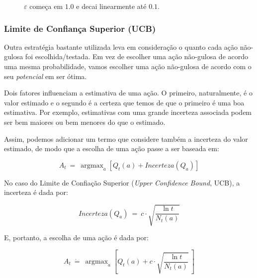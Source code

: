 \documentclass{article}
\DeclareMathOperator*{\argmax}{argmax}
\begin{document}
\begin{itemize}
\begin{figure}[ht]
                        \caption{$\varepsilon$ começa em $1.0$ e decai linearmente até $0.1$.}
                        \label{diag:epsilon-decay}
                    \end{figure}
                \end{itemize}
            
        \subsubsection{Limite de Confiança Superior (UCB)}
        
            Outra estratégia bastante utilizada leva em consideração o quanto cada ação não-gulosa foi escolhida/testada. Em vez de escolher uma ação não-gulosa de acordo uma mesma probabilidade, vamos escolher uma ação não-gulosa de acordo com o seu \emph{potencial} em ser ótima.
            
            Dois fatores influenciam a estimativa de uma ação. O primeiro, naturalmente, é o valor estimado e o segundo é a certeza que temos de que o primeiro é uma boa estimativa. Por exemplo, estimativas com uma grande incerteza associada podem ser bem maiores ou bem menores do que o estimado.
            
            Assim, podemos adicionar um termo que considere também a incerteza do valor estimado, de modo que a escolha de uma ação passe a ser baseada em:
            
            \begin{equation}
                A_t \ = \ \argmax_a \left[ Q_t(a) + Incerteza(Q_a) \right]
            \end{equation}
            
            No caso do Limite de Confiação Superior (\emph{Upper Confidence Bound}, UCB), a incerteza é dada por:
            
            \begin{equation}
                Incerteza(Q_a) \ = \ c \cdot \sqrt{\frac{\ln{t}}{N_t(a)}}
            \end{equation}
            
            E, portanto, a escolha de uma ação é dada por:
            
            \begin{equation}
                A_t \ \dot{=} \ \argmax_a \left[ Q_t(a) + c \cdot \sqrt{\frac{\ln{t}}{N_t(a)}} \ \right]
            \end{equation}
            
\end{document}
